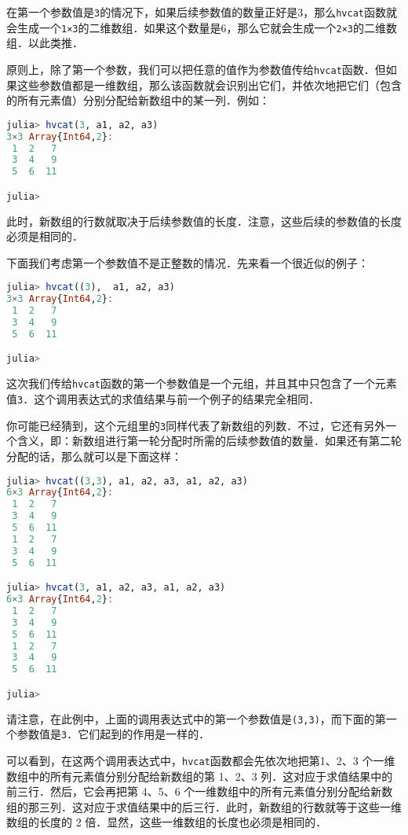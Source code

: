 在第一个参数值是\verb|3|的情况下，如果后续参数值的数量正好是3，那么\verb|hvcat|函数就会生成一个\verb|1×3|的二维数组．如果这个数量是6，那么它就会生成一个\verb|2×3|的二维数组．以此类推．

原则上，除了第一个参数，我们可以把任意的值作为参数值传给\verb|hvcat|函数．但如果这些参数值都是一维数组，那么该函数就会识别出它们，并依次地把它们（包含的所有元素值）分别分配给新数组中的某一列．例如：

\begin{lstlisting}[language=julia]
julia> hvcat(3, a1, a2, a3)
3×3 Array{Int64,2}:
 1  2   7
 3  4   9
 5  6  11

julia> 
\end{lstlisting}

此时，新数组的行数就取决于后续参数值的长度．注意，这些后续的参数值的长度必须是相同的．

下面我们考虑第一个参数值不是正整数的情况．先来看一个很近似的例子：

\begin{lstlisting}[language=julia]
julia> hvcat((3),  a1, a2, a3)
3×3 Array{Int64,2}:
 1  2   7
 3  4   9
 5  6  11

julia>
\end{lstlisting}

这次我们传给\verb|hvcat|函数的第一个参数值是一个元组，并且其中只包含了一个元素值\verb|3|．这个调用表达式的求值结果与前一个例子的结果完全相同．

你可能已经猜到，这个元组里的\verb|3|同样代表了新数组的列数．不过，它还有另外一个含义，即：新数组进行第一轮分配时所需的后续参数值的数量．如果还有第二轮分配的话，那么就可以是下面这样：

\begin{lstlisting}[language=julia]
julia> hvcat((3,3), a1, a2, a3, a1, a2, a3)
6×3 Array{Int64,2}:
 1  2   7
 3  4   9
 5  6  11
 1  2   7
 3  4   9
 5  6  11

julia> hvcat(3, a1, a2, a3, a1, a2, a3)
6×3 Array{Int64,2}:
 1  2   7
 3  4   9
 5  6  11
 1  2   7
 3  4   9
 5  6  11

julia> 
\end{lstlisting}

请注意，在此例中，上面的调用表达式中的第一个参数值是\verb|(3,3)|，而下面的第一个参数值是\verb|3|．它们起到的作用是一样的．

可以看到，在这两个调用表达式中，\verb|hvcat|函数都会先依次地把第1、2、3 个一维数组中的所有元素值分别分配给新数组的第 1、2、3 列．这对应于求值结果中的前三行．然后，它会再把第 4、5、6 个一维数组中的所有元素值分别分配给新数组的那三列．这对应于求值结果中的后三行．此时，新数组的行数就等于这些一维数组的长度的 2 倍．显然，这些一维数组的长度也必须是相同的．

